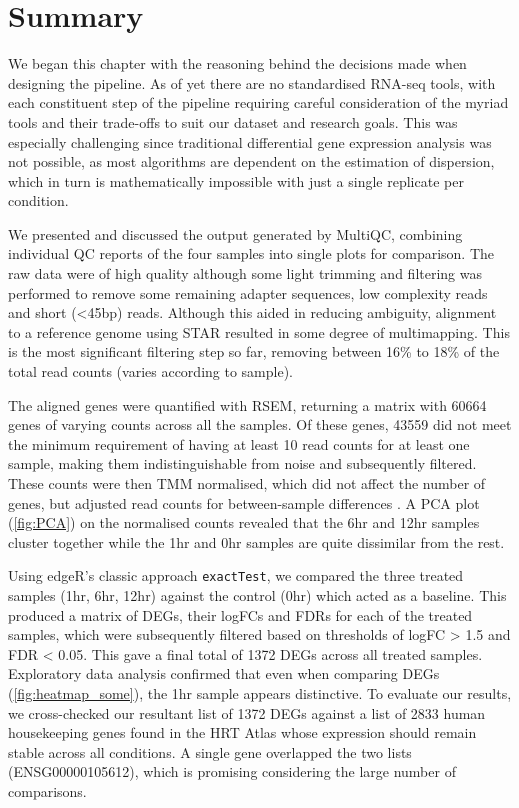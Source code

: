 
\section{Summary}

We began this chapter with the reasoning behind the decisions made when designing the pipeline. As of yet there are no standardised RNA-seq tools, with each constituent step of the pipeline requiring careful consideration of the myriad tools and their trade-offs to suit our dataset and research goals. This was especially challenging since traditional differential gene expression analysis was not possible, as most algorithms are dependent on the estimation of dispersion, which in turn is mathematically impossible with just a single replicate per condition. 

We presented and discussed the output generated by MultiQC, combining individual QC reports of the four samples into single plots for comparison. The raw data were of high quality although some light trimming and filtering was performed to remove some remaining adapter sequences, low complexity reads and short (<45bp) reads. Although this aided in reducing ambiguity, alignment to a reference genome using STAR resulted in some degree of multimapping. This is the most significant filtering step so far, removing between 16\% to 18\% of the total read counts (varies according to sample).

The aligned genes were quantified with RSEM, returning a matrix with 60664 genes of varying counts across all the samples. Of these genes, 43559 did not meet the minimum requirement of having at least 10 read counts for at least one sample, making them indistinguishable from noise and subsequently filtered. These counts were then \ac{TMM} normalised, which did not affect the number of genes, but adjusted read counts for between-sample differences \citep{robinson2010scaling}. A PCA plot (\autoref{fig:PCA}) on the normalised counts revealed that the 6hr and 12hr samples cluster together while the 1hr and 0hr samples are quite dissimilar from the rest.

Using edgeR's classic approach \texttt{exactTest}, we compared the three treated samples (1hr, 6hr, 12hr) against the control (0hr) which acted as a baseline. This produced a matrix of \ac{DEG}s, their \ac{logFC}s and \ac{FDR}s for each of the treated samples, which were subsequently filtered based on thresholds of logFC > 1.5 and FDR < 0.05. This gave a final total of 1372 \ac{DEG}s across all treated samples. Exploratory data analysis confirmed that even when comparing \ac{DEG}s (\autoref{fig:heatmap_some}), the 1hr sample appears distinctive. To evaluate our results, we cross-checked our resultant list of 1372 \ac{DEG}s against a list of 2833 human housekeeping genes found in the HRT Atlas \citep{hounkpe2021hrt} whose expression should remain stable across all conditions. A single gene overlapped the two lists (ENSG00000105612), which is promising considering the large number of comparisons. 

